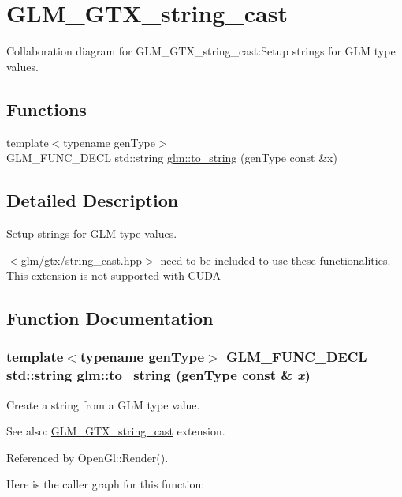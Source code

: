 \hypertarget{group__gtx__string__cast}{
\section{GLM\_\-GTX\_\-string\_\-cast}
\label{group__gtx__string__cast}
}


Collaboration diagram for GLM\_\-GTX\_\-string\_\-cast:Setup strings for GLM type values.  
\subsection*{Functions}
\begin{CompactItemize}
\item 
{\footnotesize template$<$typename genType$>$ }\\GLM\_\-FUNC\_\-DECL std::string \hyperlink{group__gtx__string__cast_ga805c20a3b3ed546b5fccf481697565d}{glm::to\_\-string} (genType const \&x)
\end{CompactItemize}


\subsection{Detailed Description}
Setup strings for GLM type values. 

$<$glm/gtx/string\_\-cast.hpp$>$ need to be included to use these functionalities. This extension is not supported with CUDA 

\subsection{Function Documentation}
\hypertarget{group__gtx__string__cast_ga805c20a3b3ed546b5fccf481697565d}{
\subsubsection[to\_\-string]{\setlength{\rightskip}{0pt plus 5cm}template$<$typename genType$>$ GLM\_\-FUNC\_\-DECL std::string glm::to\_\-string (genType const \& {\em x})}}
\label{group__gtx__string__cast_ga805c20a3b3ed546b5fccf481697565d}


Create a string from a GLM type value. \begin{Desc}
\item[See also:]\hyperlink{group__gtx__string__cast}{GLM\_\-GTX\_\-string\_\-cast} extension. \end{Desc}


Referenced by OpenGl::Render().

Here is the caller graph for this function: